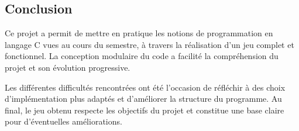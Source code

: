 \subsection*{Conclusion}

Ce projet a permit de mettre en pratique les notions de programmation en langage C vues au cours du semestre, à travers la réalisation d’un jeu complet et fonctionnel. La conception modulaire du code a facilité la compréhension du projet et son évolution progressive.

Les différentes difficultés rencontrées ont été l’occasion de réfléchir à des choix d’implémentation plus adaptés et d’améliorer la structure du programme. Au final, le jeu obtenu respecte les objectifs du projet et constitue une base claire pour d’éventuelles améliorations.
